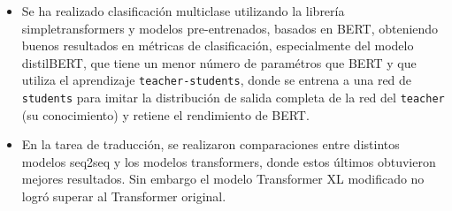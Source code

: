 \documentclass[conference]{IEEEtran}
\begin{document}
\begin{itemize}
\item Se ha realizado clasificaci\'on multiclase utilizando la librer\'ia simpletransformers y modelos pre-entrenados, basados en BERT, obteniendo buenos resultados en m\'etricas de clasificaci\'on, especialmente del modelo distilBERT, que tiene un menor n\'umero de param\'etros que BERT y que utiliza el aprendizaje \texttt{teacher-students}, donde se entrena a una red de \texttt{students} para imitar la distribuci\'on de salida completa de la red del \texttt{teacher} (su conocimiento) y retiene el rendimiento de BERT.
\item En la tarea de traducci\'on, se realizaron comparaciones entre distintos modelos seq2seq y los modelos transformers, donde estos \'ultimos obtuvieron mejores resultados. Sin embargo el modelo Transformer XL modificado no logr\'o superar al Transformer original.
\end{itemize}
\end{document}
